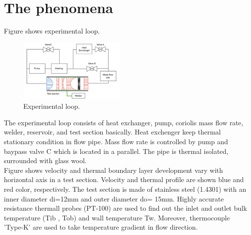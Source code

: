 \documentclass[conference]{IEEEtran}
\begin{document}
\section{The phenomena}
Figure\label{experimental_loop} shows experimental loop.
\begin{figure}[htbp]
  \centering
  \includegraphics[width=0.47\textwidth,natwidth=920,natheight=700]{fig/experimental_loop.png}
  \caption{Experimental loop.}
  \label{experimental_loop}
  \vspace{-2zh}
\end{figure}
The experimental loop consists of heat exchanger, pump, coriolis mass flow rate, welder, reservoir, and test section basically.
Heat exchenger keep thermal stationary condition in flow pipe.
Mass flow rate is controlled by pump and baypass valve C which is located in a parallel.
The pipe is thermal isolated, surrounded with glass wool.\\

Figure\label{thermal_boundary_layer_development} shows velocity and thermal boundary layer development vary with horizontal axis in a test section.
Velocity and thermal profile are shown blue and red color, respectively.
The test section is made of stainless steel (1.4301) with an inner diameter di=12mm and outer diameter do= 15mm.
Highly accurate resistance thermall probes (PT-100) are used to find out the inlet and outlet bulk temperature (Tib , Tob) and wall temperature Tw.
Moreover, thermocouple 'Type-K' are used to take temperature gradient in flow direction.
\end{document}
